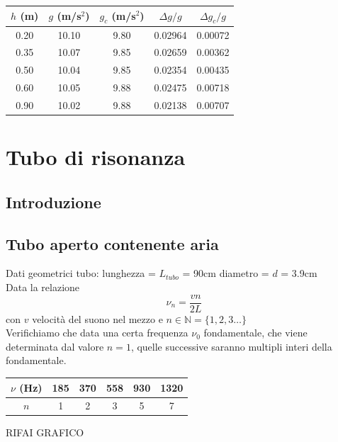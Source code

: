 \documentclass[a4paper,10pt]{report}
\begin{document}
\begin{center}
\begin{tabular}{c|c|c|c|c}
$h$ (m) & $g$ (m/s$^2$) & $g_c$ (m/s$^2$) & $\Delta g/g$ & $\Delta g_c/g$\\
\midrule
0.20 & 10.10 & 9.80 & 0.02964 & 0.00072 \\
0.35 & 10.07 & 9.85 & 0.02659 & 0.00362 \\
0.50 & 10.04 & 9.85 & 0.02354 & 0.00435 \\
0.60 & 10.05 & 9.88 & 0.02475 & 0.00718 \\
0.90 & 10.02 & 9.88 & 0.02138 & 0.00707 \\
\end{tabular}
\end{center}



\chapter{Tubo di risonanza}
\section{Introduzione}
\section{Tubo aperto contenente aria}
Dati geometrici tubo:
lunghezza = $L_{tubo}$ = 90cm
diametro = $d$ = 3.9cm
\\
Data la relazione
\begin{equation} \label{eq:gianni}
\nu_n= \frac{vn}{2L}		
\end{equation}
 con $v$ velocità del suono nel mezzo e $n \in \mathbb{N} = \{1,2,3\dots\}$ 
\\

Verifichiamo che data una certa frequenza $\nu_0$ fondamentale, che viene determinata dal valore $n=1$, quelle successive saranno multipli interi della fondamentale. 



\begin{center}
\begin{tabular}{c|c|c|c|c|c}
$\nu$ (Hz) & 185 & 370 & 558 & 930 & 1320 \\
\midrule
$n$ & 1 & 2 & 3 & 5 & 7\\
\end{tabular}
\end{center}

RIFAI GRAFICO
\end{document}
